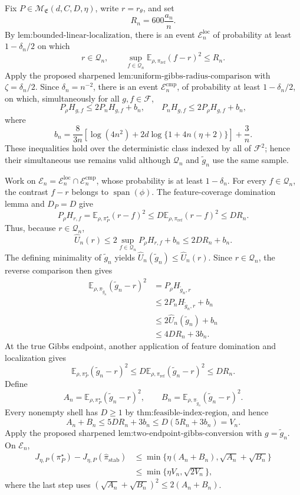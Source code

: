 Fix \(P\in\mathcal M_{\mathfrak E}(d,C,D,\eta)\), write \(r=r_\theta\), and set
\[
R_n=600\frac{a_n}{n}.
\]
By \(\text{lem:bounded-linear-localization}\), there is an event \(\mathcal E_n^{\mathrm{loc}}\) of probability at least \(1-\delta_n/2\) on which
\[
r\in\mathcal Q_n,
\qquad
\sup_{f\in\mathcal Q_n}\mathbb E_{\rho,\pi_{\mathrm{ref}}}(f-r)^2\le R_n.
\]
Apply the proposed sharpened \(\text{lem:uniform-gibbs-radius-comparison}\) with \(\zeta=\delta_n/2\). Since \(\delta_n=n^{-2}\), there is an event \(\mathcal E_n^{\mathrm{cmp}}\), of probability at least \(1-\delta_n/2\), on which, simultaneously for all \(g,f\in\mathcal F\),
\[
P_\rho H_{g,f}\le2P_nH_{g,f}+b_n,
\qquad
P_nH_{g,f}\le2P_\rho H_{g,f}+b_n,
\]
where
\[
b_n=\frac{8}{3n}\left[\log(4n^2)+2d\log\{1+4n(\eta+2)\}\right]+\frac3n.
\]
These inequalities hold over the deterministic class indexed by all of \(\mathcal F^2\); hence their simultaneous use remains valid although \(\mathcal Q_n\) and \(\widetilde g_n\) use the same sample.

Work on \(\mathcal E_n=\mathcal E_n^{\mathrm{loc}}\cap\mathcal E_n^{\mathrm{cmp}}\), whose probability is at least \(1-\delta_n\). For every \(f\in\mathcal Q_n\), the contrast \(f-r\) belongs to \(\operatorname{span}(\phi)\). The feature-coverage domination lemma and \(D_P=D\) give
\[
P_\rho H_{r,f}
=\mathbb E_{\rho,\pi_P^\star}(r-f)^2
\le D\mathbb E_{\rho,\pi_{\mathrm{ref}}}(r-f)^2
\le DR_n.
\]
Thus, because \(r\in\mathcal Q_n\),
\[
\widehat U_n(r)
\le2\sup_{f\in\mathcal Q_n}P_\rho H_{r,f}+b_n
\le2DR_n+b_n.
\]
The defining minimality of \(\widetilde g_n\) yields \(\widehat U_n(\widetilde g_n)\le\widehat U_n(r)\). Since \(r\in\mathcal Q_n\), the reverse comparison then gives
\[
\begin{aligned}
\mathbb E_{\rho,\pi_{\widetilde g_n}}(\widetilde g_n-r)^2
&=P_\rho H_{\widetilde g_n,r}\\
&\le2P_nH_{\widetilde g_n,r}+b_n\\
&\le2\widehat U_n(\widetilde g_n)+b_n\\
&\le4DR_n+3b_n.
\end{aligned}
\]
At the true Gibbs endpoint, another application of feature domination and localization gives
\[
\mathbb E_{\rho,\pi_P^\star}(\widetilde g_n-r)^2
\le D\mathbb E_{\rho,\pi_{\mathrm{ref}}}(\widetilde g_n-r)^2
\le DR_n.
\]
Define
\[
A_n=\mathbb E_{\rho,\pi_P^\star}(\widetilde g_n-r)^2,
\qquad
B_n=\mathbb E_{\rho,\pi_{\widetilde g_n}}(\widetilde g_n-r)^2.
\]
Every nonempty shell has \(D\ge1\) by \(\text{thm:feasible-index-region}\), and hence
\[
A_n+B_n\le5DR_n+3b_n
\le D(5R_n+3b_n)=V_n.
\]
Apply the proposed sharpened \(\text{lem:two-endpoint-gibbs-conversion}\) with \(g=\widetilde g_n\). On \(\mathcal E_n\),
\[
\begin{aligned}
J_{\eta,P}(\pi_P^\star)-J_{\eta,P}(\widehat\pi_{\mathrm{stab}})
&\le\min\{\eta(A_n+B_n),\sqrt{A_n}+\sqrt{B_n}\}\\
&\le\min\{\eta V_n,\sqrt{2V_n}\},
\end{aligned}
\]
where the last step uses \((\sqrt{A_n}+\sqrt{B_n})^2\le2(A_n+B_n)\).

